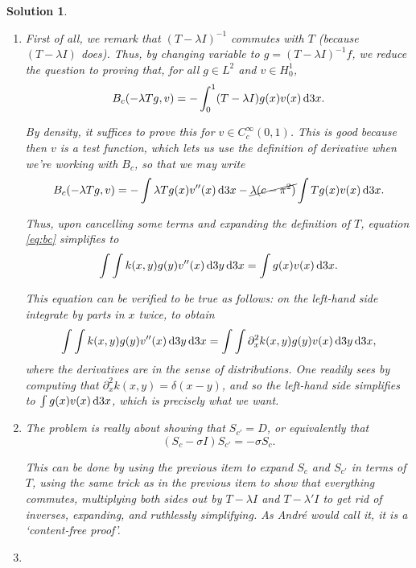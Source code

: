 \documentclass{article}
\theoremstyle{nonumberplain}
\newtheorem{sol}{Solution}
\begin{document}
\begin{sol}
\begin{enumerate}
\item First of all, we remark that $(T-\lambda I)^{-1}$ commutes with $T$ (because $(T-\lambda I)$ does). Thus, by changing variable to $g = (T-\lambda I)^{-1} f$, we reduce the question to proving that, for all $g \in L^2$ and $v \in H^1_0$,
\begin{equation}\label{eq:bc}
B_c(-\lambda T g, v) = - \int_0^1 (T-\lambda I)g(x) v(x) \dl3 x.
\end{equation}

By density, it suffices to prove this for $v \in C^\infty_c(0,1)$. This is good because then $v$ is a test function, which lets us use the definition of derivative when we're working with $B_c$, so that we may write
\begin{equation}
B_c(-\lambda T g, v) = - \int \lambda Tg(x) v''(x) \dl3 x - \cancel{\lambda (c-\pi^2)} \int Tg(x) v(x) \dl3x.
\end{equation}

Thus, upon cancelling some terms and expanding the definition of $T$, equation \eqref{eq:bc} simplifies to
\begin{equation}
\int \int k(x,y) g(y) v''(x) \dl3y \dl3x = \int g(x) v(x) \dl3x.
\end{equation}

This equation can be verified to be true as follows: on the left-hand side integrate by parts in $x$ twice, to obtain
\begin{equation}
\int \int k(x,y) g(y) v''(x) \dl3y \dl3x = \int \int \partial_x^2 k(x,y) g(y) v(x) \dl3y \dl3x,
\end{equation}
where the derivatives are in the sense of distributions. One readily sees by computing that $\partial_x^2 k(x,y) = \delta(x-y)$, and so the left-hand side simplifies to $\int g(x) v(x) \dl3x$, which is precisely what we want.

\item The problem is really about showing that $S_{c'} = D$, or equivalently that
\begin{equation}
(S_c - \sigma I) S_{c'} = -\sigma S_c.
\end{equation}

This can be done by using the previous item to expand $S_c$ and $S_{c'}$ in terms of $T$, using the same trick as in the previous item to show that everything commutes, multiplying both sides out by $T-\lambda I$ and $T-\lambda' I$ to get rid of inverses, expanding, and ruthlessly simplifying. As André would call it, it is a `content-free proof'.


\item
\end{enumerate}
\end{sol}
\end{document}
